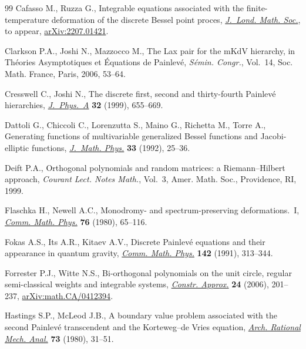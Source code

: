 \documentclass[pdftex]{sigma}%
\numberwithin{equation}{section}
\begin{document}
\begin{thebibliography}{99}
Cafasso M., Ruzza G., Integrable equations associated with the
 finite-temperature deformation of the discrete {B}essel point proces,
 \href{https://doi.org/10.1112/jlms.12745}{\textit{J.~Lond. Math. Soc.}}, {t}o appear, \href{https://arxiv.org/abs/2207.01421}{arXiv:2207.01421}.

Clarkson P.A., Joshi N., Mazzocco M., The {L}ax pair for the m{K}d{V}
 hierarchy, in Th\'eories Asymptotiques et \'Equations de {P}ainlev\'e,
 \textit{S\'emin. Congr.}, Vol.~14, Soc. Math. France, Paris, 2006, 53--64.

Cresswell C., Joshi N., The discrete first, second and thirty-fourth
 {P}ainlev\'e hierarchies, \href{https://doi.org/10.1088/0305-4470/32/4/009}{\textit{J.~Phys.~A}} \textbf{32} (1999), 655--669.

Dattoli G., Chiccoli C., Lorenzutta S., Maino G., Richetta M., Torre A.,
 Generating functions of multivariable generalized {B}essel functions and
 {J}acobi-elliptic functions, \href{https://doi.org/10.1063/1.529959}{\textit{J.~Math. Phys.}} \textbf{33} (1992),
 25--36.

Deift P.A., Orthogonal polynomials and random matrices: a {R}iemann--{H}ilbert
 approach, \textit{Courant Lect. Notes Math.}, Vol.~3, Amer. Math. Soc.,
 Providence, RI, 1999.

Flaschka H., Newell A.C., Monodromy- and spectrum-preserving deformations.~{I},
 \href{https://doi.org/10.1007/BF01197110}{\textit{Comm. Math. Phys.}} \textbf{76} (1980), 65--116.

Fokas A.S., Its A.R., Kitaev A.V., Discrete {P}ainlev\'e equations and their
 appearance in quantum gravity, \href{https://doi.org/10.1007/BF02102066}{\textit{Comm. Math. Phys.}} \textbf{142}
 (1991), 313--344.

Forrester P.J., Witte N.S., Bi-orthogonal polynomials on the unit circle,
 regular semi-classical weights and integrable systems, \href{https://doi.org/10.1007/s00365-005-0616-7}{\textit{Constr.
 Approx.}} \textbf{24} (2006), 201--237, \href{https://arxiv.org/abs/math.CA/0412394}{arXiv:math.CA/0412394}.

Hastings S.P., McLeod J.B., A boundary value problem associated with the second
 {P}ainlev\'e transcendent and the {K}orteweg--de {V}ries equation,
 \href{https://doi.org/10.1007/BF00283254}{\textit{Arch. Rational Mech. Anal.}} \textbf{73} (1980), 31--51.


\end{thebibliography}
\end{document}
